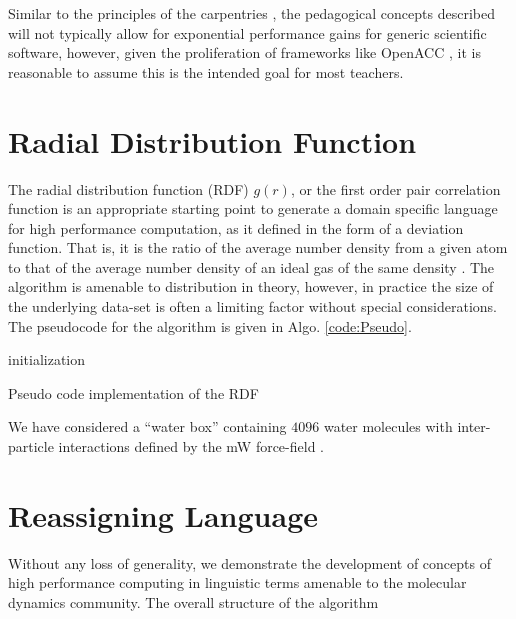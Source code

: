 \documentclass[conference]{IEEEtran}
\begin{document}
Similar to the principles of the carpentries \cite{wilsonSoftwareCarpentryGetting2006a}, the pedagogical concepts described will not typically allow for exponential performance gains for generic scientific software, however, given the proliferation of frameworks like OpenACC \cite{farberParallelProgrammingOpenACC2016}, it is reasonable to assume this is the intended goal for most teachers.
\section{Radial Distribution Function}
The radial distribution function (RDF) $g(r)$, or the first order pair correlation function is an appropriate starting point to generate a domain specific language for high performance computation, as it defined in the form of a deviation function. That is, it is the ratio of the average number density from a given atom to that of the average number density of an ideal gas of the same density \cite{frenkelUnderstandingMolecularSimulation2001}. The algorithm is amenable to distribution in theory, however, in practice the size of the underlying data-set is often a limiting factor without special considerations. The pseudocode for the algorithm is given in Algo. \ref{code:Pseudo}.
\begin{algorithm}
	initialization\;
	\caption{Pseudo code implementation of the RDF}
	\label{code:Pseudo}
\end{algorithm}
We have considered a ``water box'' containing $4096$ water molecules with inter-particle interactions defined by the mW force-field \cite{molineroWaterModeledIntermediate2009}.

\section{Reassigning Language}
Without any loss of generality, we demonstrate the development of concepts of high performance computing in linguistic terms amenable to the molecular dynamics community. The overall structure of the algorithm
\end{document}
